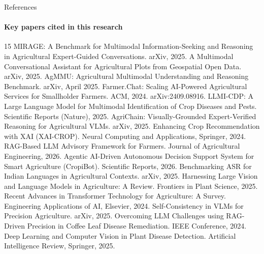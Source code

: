 \documentclass[aspectratio=169, 10pt]{beamer}
\begin{document}
\begin{frame}[allowframebreaks]{References}
  \framesubtitle{Key papers cited in this research}
  
  \begin{thebibliography}{15}
    \footnotesize
     MIRAGE: A Benchmark for Multimodal Information-Seeking and Reasoning in Agricultural Expert-Guided Conversations. arXiv, 2025.
     A Multimodal Conversational Assistant for Agricultural Plots from Geospatial Open Data. arXiv, 2025.
     AgMMU: Agricultural Multimodal Understanding and Reasoning Benchmark. arXiv, April 2025.
     Farmer.Chat: Scaling AI-Powered Agricultural Services for Smallholder Farmers. ACM, 2024. arXiv:2409.08916.
     LLMI-CDP: A Large Language Model for Multimodal Identification of Crop Diseases and Pests. Scientific Reports (Nature), 2025.
     AgriChain: Visually-Grounded Expert-Verified Reasoning for Agricultural VLMs. arXiv, 2025.
     Enhancing Crop Recommendation with XAI (XAI-CROP). Neural Computing and Applications, Springer, 2024.
     RAG-Based LLM Advisory Framework for Farmers. Journal of Agricultural Engineering, 2026.
     Agentic AI-Driven Autonomous Decision Support System for Smart Agriculture (CropiBot). Scientific Reports, 2026.
     Benchmarking ASR for Indian Languages in Agricultural Contexts. arXiv, 2025.
     Harnessing Large Vision and Language Models in Agriculture: A Review. Frontiers in Plant Science, 2025.
     Recent Advances in Transformer Technology for Agriculture: A Survey. Engineering Applications of AI, Elsevier, 2024.
     Self-Consistency in VLMs for Precision Agriculture. arXiv, 2025.
     Overcoming LLM Challenges using RAG-Driven Precision in Coffee Leaf Disease Remediation. IEEE Conference, 2024.
     Deep Learning and Computer Vision in Plant Disease Detection. Artificial Intelligence Review, Springer, 2025.
  \end{thebibliography}
\end{frame}
\end{document}
